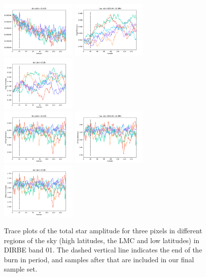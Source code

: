 \documentclass{aa}
\begin{document}
\begin{figure}
    \includegraphics[width=0.33\textwidth]{figs/mixing/exgal_trace_3121308_v1.pdf} 
  \includegraphics[width=0.33\textwidth]{figs/mixing/exgal_trace_2429499_v1.pdf}
  \includegraphics[width=0.33\textwidth]{figs/mixing/exgal_trace_1352704_v1.pdf}\\
    \includegraphics[width=0.33\textwidth]{figs/mixing/diffuse_trace_3121308_v1.pdf} 
  \includegraphics[width=0.33\textwidth]{figs/mixing/diffuse_trace_2429499_v1.pdf}
  \includegraphics[width=0.33\textwidth]{figs/mixing/diffuse_trace_1352704_v1.pdf}\\
  \caption{Trace plots of the total star amplitude for three pixels in different regions of the sky (high latitudes, the LMC and low latitudes) in DIRBE band 01. The dashed vertical line indicates the end of the burn in period, and samples after that are included in our final sample set.}
  \label{fig:amptrace}
\end{figure}
\end{document}
